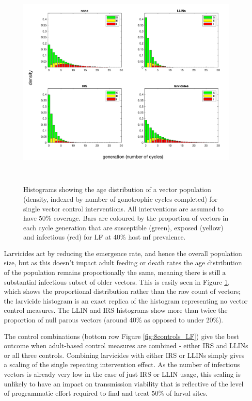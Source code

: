 \begin{figure}[h]
\begin{center}
\includegraphics[height=11cm]{Project/Figures/VectorModel/LF/populationhist_4controls_density.png}
\caption{Histograms showing the age distribution of a vector population (density, indexed by number of gonotrophic cycles completed) for single vector control interventions. All interventions are assumed to have 50\% coverage. Bars are coloured by the proportion of vectors in each cycle generation that are susceptible (green), exposed (yellow) and infectious (red) for LF at 40\% host mf prevalence.}
\label{fig:4controls}
\end{center}
\end{figure}

Larvicides act by reducing the emergence rate, and hence the overall population size, but as this doesn't impact adult feeding or death rates the age distribution of the population remains proportionally the same, meaning there is still a substantial infectious subset of older vectors. This is easily seen in Figure \ref{fig:4controls}, which shows the proportional distribution rather than the raw count of vectors; the larvicide histogram is an exact replica of the histogram representing no vector control measures. The LLIN and IRS histograms show more than twice the proportion of null parous vectors (around 40\% as opposed to under 20\%).

The control combinations (bottom row Figure \ref{fig:8controls_LF}) give the best outcome when adult-based control measures are combined - either IRS and LLINs or all three controls. Combining larvicides with either IRS or LLINs simply gives a scaling of the single repeating intervention effect. As the number of infectious vectors is already very low in the case of just IRS or LLIN usage, this scaling is unlikely to have an impact on transmission viability that is reflective of the level of programmatic effort required to find and treat 50\% of larval sites.

